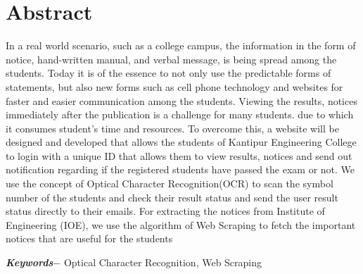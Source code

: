 





\chapter*{Abstract} %
In a real world scenario, such as a college campus, the information in the form of notice, hand-written manual, and verbal message, is being spread among the students. Today it is of the essence to not only use the predictable forms of statements, but also new forms such as cell phone technology and websites for faster and easier communication among the students. Viewing the results, notices immediately after the publication is a challenge for many students. due to which it consumes student’s time and resources. To overcome this, a website will be designed and developed that allows the students of Kantipur Engineering College to login with a unique ID that allows them to view results, notices and send out notification regarding if the registered students have passed the exam or not. We use the concept of Optical Character Recognition(OCR) to scan the symbol number of the students and check their result status and send the user result status directly to their emails. For extracting the notices from Institute of Engineering (IOE), we use the algorithm of Web Scraping to fetch the important notices that are useful for the students

\par
\textbf{\textit{Keywords$-$}} Optical Character Recognition, Web Scraping


\par

